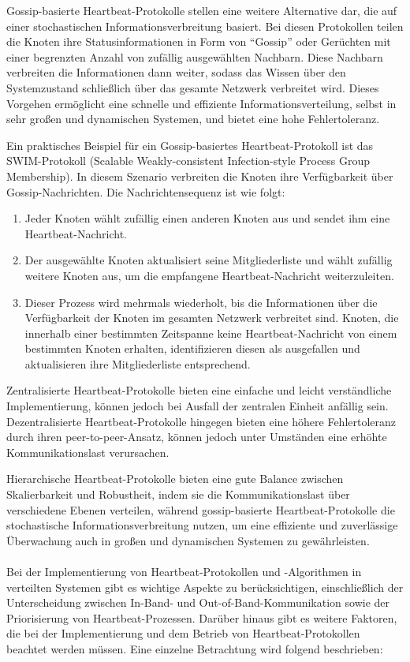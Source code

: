 Gossip-basierte Heartbeat-Protokolle stellen eine weitere Alternative dar, die auf einer stochastischen Informationsverbreitung basiert. Bei diesen Protokollen teilen die Knoten ihre Statusinformationen in Form von \enquote{Gossip} oder Gerüchten mit einer begrenzten Anzahl von zufällig ausgewählten Nachbarn. Diese Nachbarn verbreiten die Informationen dann weiter, sodass das Wissen über den Systemzustand schließlich über das gesamte Netzwerk verbreitet wird. Dieses Vorgehen ermöglicht eine schnelle und effiziente Informationsverteilung, selbst in sehr großen und dynamischen Systemen, und bietet eine hohe Fehlertoleranz.

Ein praktisches Beispiel für ein Gossip-basiertes Heartbeat-Protokoll ist das SWIM-Protokoll (Scalable Weakly-consistent Infection-style Process Group Membership). In diesem Szenario verbreiten die Knoten ihre Verfügbarkeit über Gossip-Nachrichten. Die Nachrichtensequenz ist wie folgt:
\begin{enumerate}[label=(\alph*)]
\item Jeder Knoten wählt zufällig einen anderen Knoten aus und sendet ihm eine Heartbeat-Nachricht.
\item Der ausgewählte Knoten aktualisiert seine Mitgliederliste und wählt zufällig weitere Knoten aus, um die empfangene Heartbeat-Nachricht weiterzuleiten.
\item Dieser Prozess wird mehrmals wiederholt, bis die Informationen über die Verfügbarkeit der Knoten im gesamten Netzwerk verbreitet sind.
Knoten, die innerhalb einer bestimmten Zeitspanne keine Heartbeat-Nachricht von einem bestimmten Knoten erhalten, identifizieren diesen als ausgefallen und aktualisieren ihre Mitgliederliste entsprechend.
\end{enumerate}

Zentralisierte Heartbeat-Protokolle bieten eine einfache und leicht verständliche Implementierung, können jedoch bei Ausfall der zentralen Einheit anfällig sein. Dezentralisierte Heartbeat-Protokolle hingegen bieten eine höhere Fehlertoleranz durch ihren peer-to-peer-Ansatz, können jedoch unter Umständen eine erhöhte Kommunikationslast verursachen.

Hierarchische Heartbeat-Protokolle bieten eine gute Balance zwischen Skalierbarkeit und Robustheit, indem sie die Kommunikationslast über verschiedene Ebenen verteilen, während gossip-basierte Heartbeat-Protokolle die stochastische Informationsverbreitung nutzen, um eine effiziente und zuverlässige Überwachung auch in großen und dynamischen Systemen zu gewährleisten.
\\\\
Bei der Implementierung von Heartbeat-Protokollen und -Algorithmen in verteilten Systemen gibt es wichtige Aspekte zu berücksichtigen, einschließlich der Unterscheidung zwischen In-Band- und Out-of-Band-Kommunikation sowie der Priorisierung von Heartbeat-Prozessen. Darüber hinaus gibt es weitere Faktoren, die bei der Implementierung und dem Betrieb von Heartbeat-Protokollen beachtet werden müssen. Eine einzelne Betrachtung wird folgend beschrieben:


